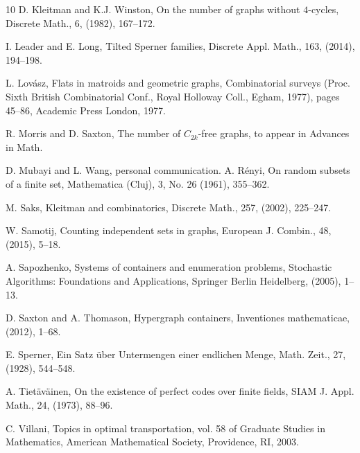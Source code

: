 \documentclass[11pt]{article}
\numberwithin{equation}{section}
\begin{document}
\begin{thebibliography}{10}
 D. Kleitman and K.J. Winston, On the number of graphs without $4$-cycles, Discrete Math., 6, (1982), 167--172.





 I. Leader and E. Long, Tilted Sperner families,  Discrete Appl. Math.,  163, (2014),  194--198.

 L. Lov\'{a}sz, Flats in matroids and geometric graphs, Combinatorial surveys (Proc.
Sixth British Combinatorial Conf., Royal Holloway Coll., Egham, 1977), pages 45--86,
Academic Press London, 1977.


 R. Morris and D. Saxton, 
The number of $C_{2k}$-free graphs,
to appear in Advances in Math.


 D. Mubayi and L. Wang, personal communication.
 A. R\'enyi, On random subsets of a finite set, Mathematica (Cluj), 3, No. 26 (1961), 355--362.

 M. Saks, Kleitman and combinatorics, Discrete Math., 257, (2002), 225--247.

 W. Samotij, 
Counting independent sets in graphs, European J. Combin., 48, (2015), 5--18.

 A.  Sapozhenko,  Systems of containers and enumeration problems, Stochastic Algorithms: Foundations and Applications, Springer Berlin Heidelberg, (2005), 1--13.

 D. Saxton and A. Thomason, Hypergraph containers, Inventiones mathematicae, (2012), 1--68.



 E. Sperner, Ein Satz \"uber Untermengen einer endlichen Menge, Math. Zeit., 27, (1928), 544--548.

 A. Tiet\"av\"ainen, On the existence of perfect codes over finite fields, SIAM J. Appl. Math.,  24, (1973), 88--96.

 C. Villani,
Topics in optimal transportation, vol. 58 of Graduate Studies in Mathematics,
American Mathematical Society, Providence, RI, 2003.

\end{thebibliography}
\end{document}
